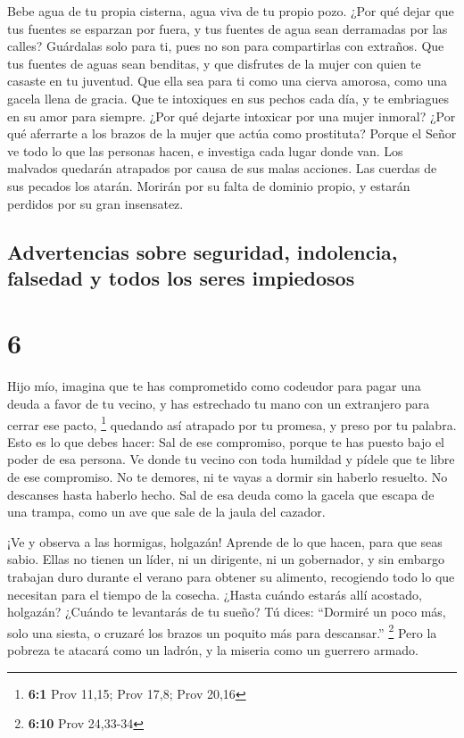  Bebe agua de tu propia cisterna, agua viva de tu propio
pozo.  ¿Por qué dejar que tus fuentes se esparzan por
fuera, y tus fuentes de agua sean derramadas por las calles?
 Guárdalas solo para ti, pues no son para compartirlas con
extraños.  Que tus fuentes de aguas sean benditas, y que
disfrutes de la mujer con quien te casaste en tu juventud. 
Que ella sea para ti como una cierva amorosa, como una gacela llena de
gracia. Que te intoxiques en sus pechos cada día, y te embriagues en su
amor para siempre.  ¿Por qué dejarte intoxicar por una
mujer inmoral? ¿Por qué aferrarte a los brazos de la mujer que actúa
como prostituta?  Porque el Señor ve todo lo que las
personas hacen, e investiga cada lugar donde van.  Los
malvados quedarán atrapados por causa de sus malas acciones. Las cuerdas
de sus pecados los atarán.  Morirán por su falta de dominio
propio, y estarán perdidos por su gran insensatez.

\hypertarget{advertencias-sobre-seguridad-indolencia-falsedad-y-todos-los-seres-impiedosos}{%
\subsection{Advertencias sobre seguridad, indolencia, falsedad y todos
los seres
impiedosos}\label{advertencias-sobre-seguridad-indolencia-falsedad-y-todos-los-seres-impiedosos}}

\hypertarget{section-5}{%
\section{6}\label{section-5}}

 Hijo mío, imagina que te has comprometido como codeudor
para pagar una deuda a favor de tu vecino, y has estrechado tu mano con
un extranjero para cerrar ese pacto, \footnote{\textbf{6:1} Prov 11,15;
  Prov 17,8; Prov 20,16}  quedando así atrapado por tu
promesa, y preso por tu palabra.  Esto es lo que debes
hacer: Sal de ese compromiso, porque te has puesto bajo el poder de esa
persona. Ve donde tu vecino con toda humildad y pídele que te libre de
ese compromiso.  No te demores, ni te vayas a dormir sin
haberlo resuelto. No descanses hasta haberlo hecho.  Sal de
esa deuda como la gacela que escapa de una trampa, como un ave que sale
de la jaula del cazador.

 ¡Ve y observa a las hormigas, holgazán! Aprende de lo que
hacen, para que seas sabio.  Ellas no tienen un líder, ni un
dirigente, ni un gobernador,  y sin embargo trabajan duro
durante el verano para obtener su alimento, recogiendo todo lo que
necesitan para el tiempo de la cosecha.  ¿Hasta cuándo
estarás allí acostado, holgazán? ¿Cuándo te levantarás de tu sueño?
 Tú dices: ``Dormiré un poco más, solo una siesta, o
cruzaré los brazos un poquito más para descansar.'' \footnote{\textbf{6:10}
  Prov 24,33-34}  Pero la pobreza te atacará como un
ladrón, y la miseria como un guerrero armado.

